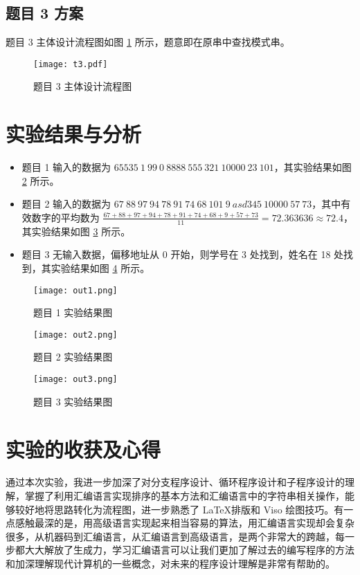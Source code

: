 \documentclass[12pt,AutoFakeBold]{article}
\begin{document}
\subsection{题目 3 方案}

题目 3 主体设计流程图如图 \ref{pro:t3} 所示，题意即在原串中查找模式串。

\begin{figure}[hbtp]
	\centering
	\texttt{[image: t3.pdf]}
	\caption{题目 3 主体设计流程图}\label{pro:t3}
\end{figure}

\section{实验结果与分析}

\begin{itemize}
	\item 题目 1 输入的数据为 $65535\ 1\ 99\ 0\ 8888\ 555\ 321\ 10000\ 23\ 101$，其实验结果如图 \ref{fig:out1} 所示。
	\item 题目 2 输入的数据为 $67\ 88\ 97\ 94\ 78\ 91\ 74\ 68\ 101\ 9\ asd345\ 10000\ 57\ 73$，其中有效数字的平均数为 $\displaystyle\frac{67+88+97+94+78+91+74+68+9+57+73}{11}=72.363636\approx72.4$，其实验结果如图 \ref{fig:out2} 所示。
	\item 题目 3 无输入数据，偏移地址从 0 开始，则学号在 3 处找到，姓名在 18 处找到，其实验结果如图 \ref{fig:out3} 所示。
\end{itemize}

\begin{figure}[hbtp]
	\centering
	\texttt{[image: out1.png]}
	\caption{题目 1 实验结果图}\label{fig:out1}
\end{figure}

\begin{figure}[hbtp]
	\centering
	\texttt{[image: out2.png]}
	\caption{题目 2 实验结果图}\label{fig:out2}
\end{figure}

\begin{figure}[hbtp]
	\centering
	\texttt{[image: out3.png]}
	\caption{题目 3 实验结果图}\label{fig:out3}
\end{figure}


\section{实验的收获及心得}

通过本次实验，我进一步加深了对分支程序设计、循环程序设计和子程序设计的理解，掌握了利用汇编语言实现排序的基本方法和汇编语言中的字符串相关操作，能够较好地将思路转化为流程图，进一步熟悉了 \LaTeX 排版和 Viso 绘图技巧。有一点感触最深的是，用高级语言实现起来相当容易的算法，用汇编语言实现却会复杂很多，从机器码到汇编语言，从汇编语言到高级语言，是两个非常大的跨越，每一步都大大解放了生成力，学习汇编语言可以让我们更加了解过去的编写程序的方法和加深理解现代计算机的一些概念，对未来的程序设计理解是非常有帮助的。
\end{document}
